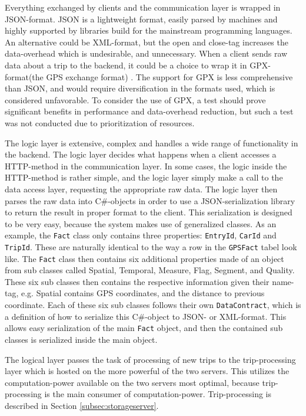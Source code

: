Everything exchanged by clients and the communication layer is wrapped in JSON-format. JSON is a lightweight format, easily parsed by machines and highly supported by libraries build for the mainstream programming languages. An alternative could be XML-format, but the open and close-tag increases the data-overhead which is undesirable, and unnecessary. When a client sends raw data about a trip to the backend, it could be a choice to wrap it in GPX-format(the GPS exchange format) \citep{GPX_format}. The support for GPX is less comprehensive than JSON, and would require diversification in the formats used, which is considered unfavorable. To consider the use of GPX, a test should prove significant benefits in performance and data-overhead reduction, but such a test was not conducted due to prioritization of resources. 

The logic layer is extensive, complex and handles a wide range of functionality in the backend. The logic layer decides what happens when a client accesses a HTTP-method in the communication layer. In some cases, the logic inside the HTTP-method is rather simple, and the logic layer simply make a call to the data access layer, requesting the appropriate raw data. The logic layer then parses the raw data into C\#-objects in order to use a JSON-serialization library to return the result in proper format to the client. This serialization is designed to be very easy, because the system makes use of generalized classes. As an example, the \texttt{Fact} class  only contains three properties: \texttt{EntryId}, \texttt{CarId} and \texttt{TripId}. These are naturally identical to the way a row in the \texttt{GPSFact} tabel look like. The \texttt{Fact} class then contains six additional properties made of an object from sub classes called Spatial, Temporal, Measure, Flag, Segment, and Quality. These six sub classes then contains the respective information given their name-tag, e.g. Spatial contains GPS coordinates, and the distance to previous coordinate. Each of these six sub classes follows their own \texttt{DataContract}, which is a definition of how to serialize this C\#-object to JSON- or XML-format. This allows easy serialization of the main \texttt{Fact} object, and then the contained sub classes is serialized inside the main object.

The logical layer passes the task of processing of new trips to the trip-processing layer which is hosted on the more powerful of the two servers. This utilizes the computation-power available on the two servers most optimal, because trip-processing is the main consumer of computation-power. Trip-processing is described in Section \ref{subsec:storageserver}. 

